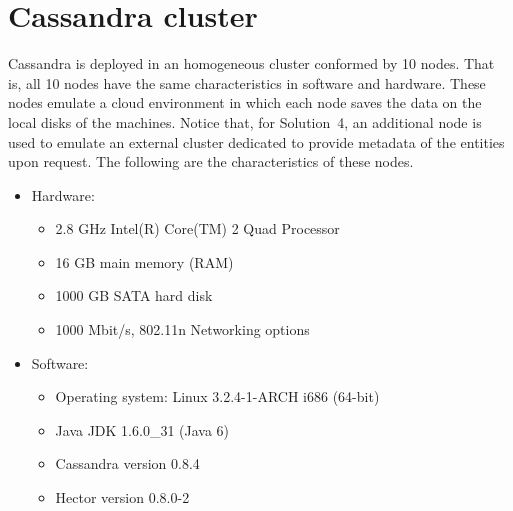 % 	
% 			
% 			


\section{Cassandra cluster} \label{sexp:CassandraCluster}
Cassandra is deployed in an homogeneous cluster conformed by 10 nodes.  That is, 
 all 10 nodes have the same characteristics in software and hardware.  These
 nodes emulate a cloud environment in which each node saves
 the data on the local disks of the machines.  Notice that,  for Solution~4,   an
 additional node is used to emulate an external cluster dedicated to provide
 metadata of the entities upon request. 
 The following are the characteristics of these nodes. 


\begin{itemize}
  \item Hardware:
  	\begin{itemize}
  	  \item 2.8 GHz Intel(R) Core(TM) 2 Quad Processor %
  	  \item 16 GB main memory (RAM)%
  	  \item 1000 GB SATA hard disk %
  	  \item 1000 Mbit/s,  802.11n Networking options
  	 \end{itemize}
  \item Software: 
  \begin{itemize}
    \item Operating system: Linux 3.2.4-1-ARCH i686 (64-bit)
    \item Java JDK 1.6.0\_31 (Java 6)
    \item Cassandra version 0.8.4 
    \item Hector version 0.8.0-2
  \end{itemize}
\end{itemize}


